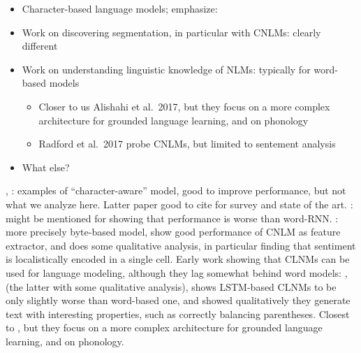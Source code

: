 \begin{itemize}
\item Character-based language models; emphasize:
\item Work on discovering segmentation, in particular with CNLMs:
  clearly different
\item Work on understanding linguistic knowledge of NLMs: typically
  for word-based models
  \begin{itemize}
  \item Closer to us Alishahi et al.~2017, but they focus on a more
    complex architecture for grounded language learning, and on
    phonology
  \item Radford et al.~2017 probe CNLMs, but limited to sentement
    analysis
  \end{itemize}
\item What else?
\end{itemize}


\cite{Kim:etal:2016}, \cite{Gerz:etal:2018}: examples of
``character-aware'' model, good to improve performance, but not what
we analyze here. Latter paper good to cite for survey and state of the
art. \cite{Bojanowski:etal:2016}: might be mentioned for showing that
performance is worse than word-RNN. \cite{Radford:etal:2017}: more
precisely byte-based model, show good performance of CNLM as feature
extractor, and does some qualitative analysis, in particular finding
that sentiment is localistically encoded in a single cell. Early work
showing that CLNMs can be used for language modeling, although they
lag somewhat behind word models: \cite{Mikolov:etal:2011},
\cite{Sutskever:etal:2011} (the latter with some qualitative
analysis), \cite{Graves:2014} shows LSTM-based CLNMs to be only
slightly worse than word-based one, and showed qualitatively they
generate text with interesting properties, such as correctly balancing
parentheses. Closest to \cite{Alishahi:etal:2017}, but they focus on a
more complex architecture for grounded language learning, and on
phonology.

